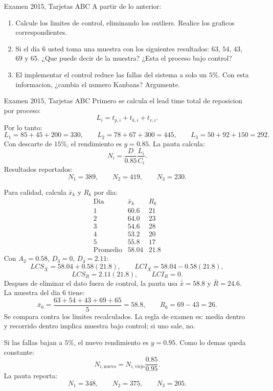 \begin{enunciado}{Examen 2015, Tarjetas ABC}
A partir de lo anterior:
\begin{enumerate}[label=\alph*),resume]
  \item Calcule los limites de control, eliminando los outliers. Realice los graficos correspondientes.
  \item Si el dia 6 usted toma una muestra con los siguientes resultados: $63$, $54$, $43$, $69$ y $65$. ¿Que puede decir de la muestra? ¿Esta el proceso bajo control?
  \item El implementar el control reduce las fallas del sistema a solo un $5\%$. Con esta informacion, ¿cambia el numero Kanbans? Argumente.
\end{enumerate}
\end{enunciado}

\begin{pautacompleta}{Examen 2015, Tarjetas ABC}
Primero se calcula el lead time total de reposicion por proceso:
\[
  L_i=t_{p,i}+t_{k,i}+t_{v,i}.
\]
Por lo tanto:
\[
  L_1=85+45+200=330,\qquad
  L_2=78+67+300=445,\qquad
  L_3=50+92+150=292.
\]
Con descarte de $15\%$, el rendimiento es $y=0.85$. La pauta calcula:
\[
  N_i=\frac{D}{0.85}\frac{L_i}{C_i}.
\]
Resultados reportados:
\[
  N_1=389,\qquad N_2=419,\qquad N_3=230.
\]

Para calidad, calcula $\bar x_k$ y $R_k$ por dia:
\[
\begin{array}{c|cc}
\text{Dia} & \bar x_k & R_k\\
\hline
1&60.6&21\\
2&64.0&23\\
3&54.6&28\\
4&53.2&20\\
5&55.8&17\\
\hline
\text{Promedio}&58.04&21.8
\end{array}
\]
Con $A_2=0.58$, $D_3=0$, $D_4=2.11$:
\[
  LCS_{\bar X}=58.04+0.58(21.8),\qquad
  LCI_{\bar X}=58.04-0.58(21.8),
\]
\[
  LCS_R=2.11(21.8),\qquad LCI_R=0.
\]
Despues de eliminar el dato fuera de control, la pauta usa $\bar{\bar x}=58.8$ y $\bar R=24.6$. La muestra del dia 6 tiene:
\[
  \bar x_6=\frac{63+54+43+69+65}{5}=58.8,\qquad R_6=69-43=26.
\]
Se compara contra los limites recalculados. La regla de examen es: media dentro y recorrido dentro implica muestra bajo control; si uno sale, no.

Si las fallas bajan a $5\%$, el nuevo rendimiento es $y=0.95$. Como lo demas queda constante:
\[
  N_{i,\text{nuevo}}=N_{i,\text{viejo}}\frac{0.85}{0.95}.
\]
La pauta reporta:
\[
  N_1=348,\qquad N_2=375,\qquad N_3=205.
\]
\end{pautacompleta}

